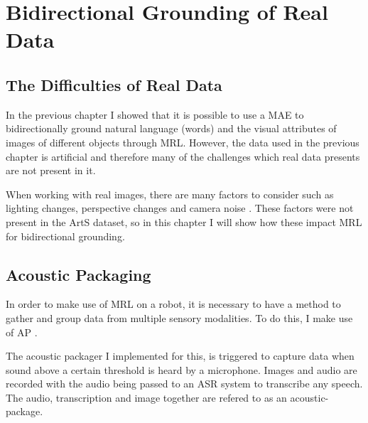 
\chapter{Bidirectional Grounding of Real Data} %

\label{Chapter6} %


\section{The Difficulties of Real Data}
In the previous chapter I showed that it is possible to use a \ac{MAE} to bidirectionally ground natural language (words) and the visual attributes of images of different objects through \ac{MRL}. However, the data used in the previous chapter is artificial and therefore many of the challenges which real data presents are not present in it. 

When working with real images, there are many factors to consider such as lighting changes, perspective changes and camera noise \cite{keller2016analysis}. These factors were not present in the ArtS dataset, so in this chapter I will show how these impact \ac{MRL} for bidirectional grounding.

\section{Acoustic Packaging}
In order to make use of \ac{MRL} on a robot, it is necessary to have a method to gather and group data from multiple sensory modalities. To do this, I make use of \ac{AP} \cite{schillingmann2009towards, schillingmann2009computational}.

The acoustic packager I implemented for this, is triggered to capture data when sound above a certain threshold is heard by a microphone. Images and audio are recorded with the audio being passed to an \ac{ASR} system to transcribe any speech. The audio, transcription and image together are refered to as an acoustic-package.


